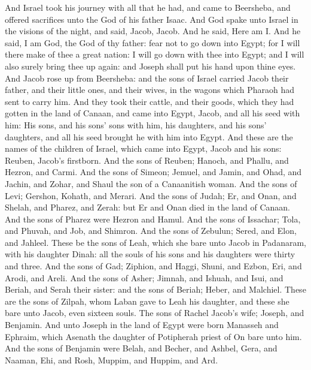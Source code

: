 \begin{biblechapter} %
 And Israel took his journey with all that he had, and came to Beersheba, and offered sacrifices unto the God of his father Isaac.
\verse And God spake unto Israel in the visions of the night, and said, Jacob, Jacob. And he said, Here am I.
\verse And he said, I am God, the God of thy father: fear not to go down into Egypt; for I will there make of thee a great nation:
\verse I will go down with thee into Egypt; and I will also surely bring thee up again: and Joseph shall put his hand upon thine eyes.
\verse And Jacob rose up from Beersheba: and the sons of Israel carried Jacob their father, and their little ones, and their wives, in the wagons which Pharaoh had sent to carry him.
\verse And they took their cattle, and their goods, which they had gotten in the land of Canaan, and came into Egypt, Jacob, and all his seed with him:
\verse His sons, and his sons' sons with him, his daughters, and his sons' daughters, and all his seed brought he with him into Egypt.
\verse And these are the names of the children of Israel, which came into Egypt, Jacob and his sons: Reuben, Jacob's firstborn.
\verse And the sons of Reuben; Hanoch, and Phallu, and Hezron, and Carmi.
\verse And the sons of Simeon; Jemuel, and Jamin, and Ohad, and Jachin, and Zohar, and Shaul the son of a Canaanitish woman.
\verse And the sons of Levi; Gershon, Kohath, and Merari.
\verse And the sons of Judah; Er, and Onan, and Shelah, and Pharez, and Zerah: but Er and Onan died in the land of Canaan. And the sons of Pharez were Hezron and Hamul.
\verse And the sons of Issachar; Tola, and Phuvah, and Job, and Shimron.
\verse And the sons of Zebulun; Sered, and Elon, and Jahleel.
\verse These be the sons of Leah, which she bare unto Jacob in Padanaram, with his daughter Dinah: all the souls of his sons and his daughters were thirty and three.
\verse And the sons of Gad; Ziphion, and Haggi, Shuni, and Ezbon, Eri, and Arodi, and Areli.
\verse And the sons of Asher; Jimnah, and Ishuah, and Isui, and Beriah, and Serah their sister: and the sons of Beriah; Heber, and Malchiel.
\verse These are the sons of Zilpah, whom Laban gave to Leah his daughter, and these she bare unto Jacob, even sixteen souls.
\verse The sons of Rachel Jacob's wife; Joseph, and Benjamin.
\verse And unto Joseph in the land of Egypt were born Manasseh and Ephraim, which Asenath the daughter of Potipherah priest of On bare unto him.
\verse And the sons of Benjamin were Belah, and Becher, and Ashbel, Gera, and Naaman, Ehi, and Rosh, Muppim, and Huppim, and Ard.

\end{biblechapter}
